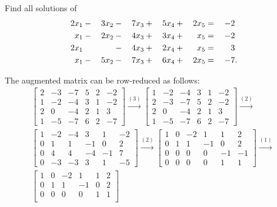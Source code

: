  Find all solutions of
\begin{alignat*}{6}
  2x_1 &{}-{}& 3x_2 &{}-{}& 7x_3 &{}+{}& 5x_4 &{}+{}& 2x_5 &{}={}& -2 \\
  x_1 &{}-{}& 2x_2 &{}-{}& 4x_3 &{}+{}& 3x_4 &{}+{}& x_5 &{}={}& -2 \\
  2x_1 && &{}-{}& 4x_3 &{}+{}& 2x_4 &{}+{}& x_5 &{}={}& 3 \\
  x_1 &{}-{}& 5x_2 &{}-{}& 7x_3 &{}+{}& 6x_4 &{}+{}& 2x_5 &{}={}& -7\rlap.
\end{alignat*}
\begin{solution}
  The augmented matrix can be row-reduced as follows:
  \begin{gather*}
    \begin{bmatrix}
      2 & -3 & -7 & 5 & 2 & -2 \\
      1 & -2 & -4 & 3 & 1 & -2 \\
      2 & 0 & -4 & 2 & 1 & 3 \\
      1 & -5 & -7 & 6 & 2 & -7
    \end{bmatrix}
    \xrightarrow{(3)}
    \begin{bmatrix}
      1 & -2 & -4 & 3 & 1 & -2 \\
      2 & -3 & -7 & 5 & 2 & -2 \\
      2 & 0 & -4 & 2 & 1 & 3 \\
      1 & -5 & -7 & 6 & 2 & -7
    \end{bmatrix}
    \xrightarrow{(2)} \\
    \begin{bmatrix}
      1 & -2 & -4 & 3 & 1 & -2 \\
      0 & 1 & 1 & -1 & 0 & 2 \\
      0 & 4 & 4 & -4 & -1 & 7 \\
      0 & -3 & -3 & 3 & 1 & -5
    \end{bmatrix}
    \xrightarrow{(2)}
    \begin{bmatrix}
      1 & 0 & -2 & 1 & 1 & 2 \\
      0 & 1 & 1 & -1 & 0 & 2 \\
      0 & 0 & 0 & 0 & -1 & -1 \\
      0 & 0 & 0 & 0 & 1 & 1
    \end{bmatrix}
    \xrightarrow{(1)} \\
    \begin{bmatrix}
      1 & 0 & -2 & 1 & 1 & 2 \\
      0 & 1 & 1 & -1 & 0 & 2 \\
      0 & 0 & 0 & 0 & 1 & 1 \\

\end{bmatrix}
\end{gather*}
\end{solution}
